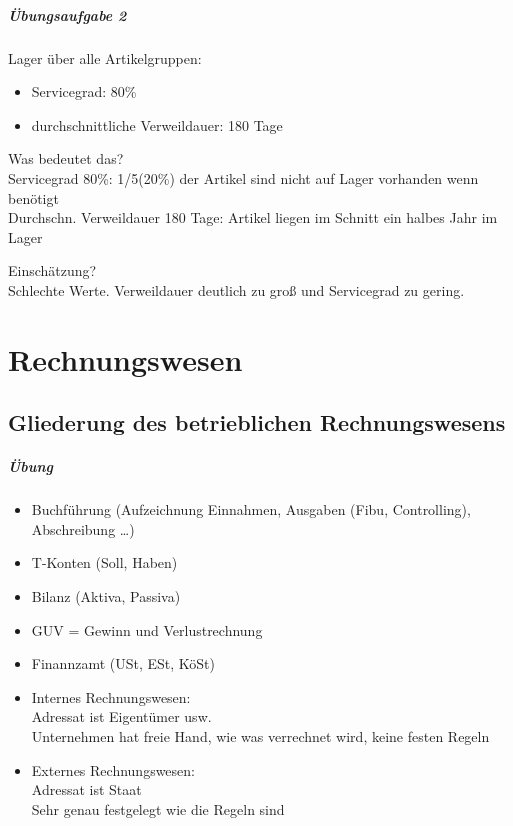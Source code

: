 \paragraph{Übungsaufgabe 2} Lager über alle Artikelgruppen:
\begin{itemize}
\item Servicegrad: 80\%
\item durchschnittliche Verweildauer: 180 Tage
\end{itemize}
\begin{anumerate}
\item Was bedeutet das?\\
Servicegrad 80\%: 1/5(20\%) der Artikel sind nicht auf Lager vorhanden wenn benötigt\\
Durchschn. Verweildauer 180 Tage: Artikel liegen im Schnitt ein halbes Jahr im Lager
\item Einschätzung?\\
Schlechte Werte. Verweildauer deutlich zu groß und Servicegrad zu gering.
\end{anumerate}

\chapter{Rechnungswesen}
\section{Gliederung des betrieblichen Rechnungswesens}
\paragraph{Übung}
\begin{itemize}
\item Buchführung (Aufzeichnung Einnahmen, Ausgaben (Fibu, Controlling), Abschreibung …)
\item T-Konten (Soll, Haben)
\item Bilanz (Aktiva, Passiva)
\item GUV = Gewinn und Verlustrechnung
\item Finannzamt (USt, ESt, KöSt)
\end{itemize}
\begin{itemize}
\item Internes Rechnungswesen: \\
Adressat ist Eigentümer usw.\\
Unternehmen hat freie Hand, wie was verrechnet wird, keine festen Regeln
\item Externes Rechnungswesen: \\
Adressat ist Staat\\
Sehr genau festgelegt wie die Regeln sind 
\end{itemize}
